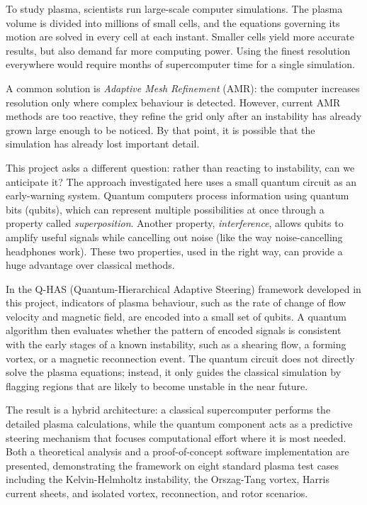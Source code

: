 \documentclass[12pt, a4paper, oneside]{report}
\begin{document}
To study plasma, scientists run large-scale computer simulations. The plasma volume is divided into millions of small cells, and the equations governing its motion are solved in every cell at each instant. Smaller cells yield more accurate results, but also demand far more computing power. Using the finest resolution everywhere would require months of supercomputer time for a single simulation.

A common solution is \textit{Adaptive Mesh Refinement} (AMR): the computer increases resolution only where complex behaviour is detected. However, current AMR methods are too reactive, they refine the grid only after an instability has already grown large enough to be noticed. By that point, it is possible that the simulation has already lost important detail.

This project asks a different question: rather than reacting to instability, can we anticipate it? The approach investigated here uses a small quantum circuit as an early-warning system. Quantum computers process information using quantum bits (qubits), which can represent multiple possibilities at once through a property called \textit{superposition}. Another property, \textit{interference}, allows qubits to amplify useful signals while cancelling out noise (like the way noise-cancelling headphones work). These two properties, used in the right way, can provide a huge advantage over classical methods.

In the Q-HAS (Quantum-Hierarchical Adaptive Steering) framework developed in this project, indicators of plasma behaviour, such as the rate of change of flow velocity and magnetic field, are encoded into a small set of qubits. A quantum algorithm then evaluates whether the pattern of encoded signals is consistent with the early stages of a known instability, such as a shearing flow, a forming vortex, or a magnetic reconnection event. The quantum circuit does not directly solve the plasma equations; instead, it only guides the classical simulation by flagging regions that are likely to become unstable in the near future.

The result is a hybrid architecture: a classical supercomputer performs the detailed plasma calculations, while the quantum component acts as a predictive steering mechanism that focuses computational effort where it is most needed. Both a theoretical analysis and a proof-of-concept software implementation are presented, demonstrating the framework on eight standard plasma test cases including the Kelvin-Helmholtz instability, the Orszag-Tang vortex, Harris current sheets, and isolated vortex, reconnection, and rotor scenarios.
\end{document}
